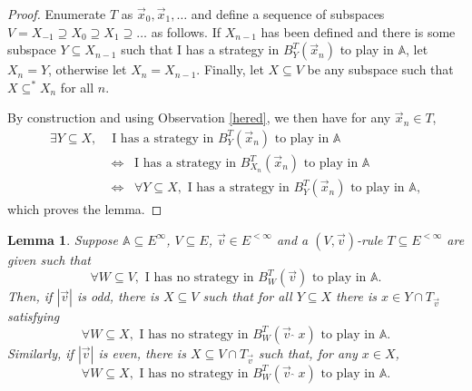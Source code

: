 \documentclass[10pt]{amsart}
\newcommand {\A}{\mathbb A}
\newcommand{\con}{\;\hat{}\;}
\newcommand{\equi}{\Longleftrightarrow}
\newcommand {\e} {\exists}
\renewcommand {\a} {\forall}
\newtheorem{lemme}[thm]{Lemma}
\theoremstyle{definition}
\begin{document}
\begin{proof}Enumerate $T$ as $\vec x_0,\vec x_1,\ldots$ and define a sequence of subspaces $V=X_{-1}\supseteq X_0\supseteq X_1\supseteq\ldots$ as follows. If $X_{n-1}$ has been defined and there is some subspace $Y\subseteq X_{n-1}$ such that I has a strategy in $B^T_Y(\vec x_n)$ to play in $\A$, let $X_n=Y$, otherwise let $X_n=X_{n-1}$. Finally, let $X\subseteq V$ be any subspace such that $X\subseteq^*X_n$ for all $n$.

By construction and using Observation \ref{hered}, we then have for any $\vec x_n\in T$,  
\[\begin{split}
\e Y\subseteq X, &\text{ I has a strategy in $B^T_Y(\vec x_n)$ to play in $\A$ }\\
&
\equi\;\;
\text{I has a strategy in $B^T_{X_n}(\vec x_n)$ to play in $\A$}
\\
&
\equi\;\;
\a Y\subseteq X, \text{ I has a strategy in $B^T_{Y}(\vec x_n)$ to play in $\A$},
\end{split}\]
which proves the lemma.
\end{proof}


\begin{lemme}\label{davis0}
Suppose $\A\subseteq E^\infty$, $V\subseteq E$, $\vec v\in E^{<\infty}$ and a $(V,\vec v)$-rule $T\subseteq E^{<\infty}$ are given such that 
$$
\a W\subseteq V,  \text{ I has no strategy in $B^T_W(\vec v)$ to play in $\A$}.
$$
Then, if $|\vec v|$ is odd, there is $X\subseteq V$ such that for all $Y\subseteq X$ there is $x\in Y\cap T_{\vec v}$ satisfying 
$$
\a W\subseteq X, \text{ I has no strategy in  $B^T_W(\vec v\con x)$ to play in $\A$}.
$$
Similarly, if $|\vec v|$ is even, there is $X\subseteq V\cap T_{\vec v}$ such that, for any $x\in X$, 
$$
\a W\subseteq X,  \text{ I has no strategy in $B^T_W(\vec v\con x)$ to play in $\A$}.
$$
\end{lemme}
\end{document}
